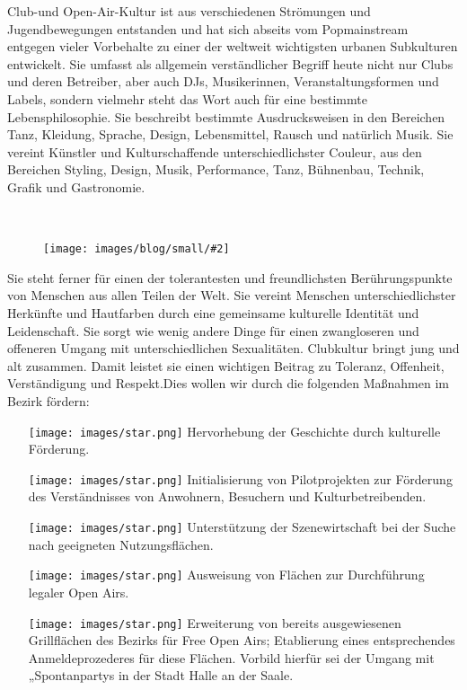 \documentclass[a4paper,10pt]{article}
\newcommand{\mysection}[1]{{\vspace{1cm}\noindent\color{gray}{\ttfamily\LARGE\raggedright #1}\\\medskip}}
\newcommand{\abschnitt}[2]{%
\mysection{\raggedright #1}%
\begin{figure}[t]%
\vspace*{-2.7cm}%
\hspace*{-2.1cm}%
\texttt{[image: images/blog/small/\#2]} %
\end{figure}%
}
\begin{document}
Club-und Open-Air-Kultur ist aus verschiedenen Strömungen und
Jugendbewegungen entstanden und hat sich abseits vom Popmainstream
entgegen vieler Vorbehalte zu einer der weltweit wichtigsten urbanen
Subkulturen entwickelt. Sie umfasst als allgemein verständlicher Begriff
heute nicht nur Clubs und deren Betreiber, aber auch DJs, Musikerinnen,
Veranstaltungsformen und Labels, sondern vielmehr steht das Wort auch
für eine bestimmte Lebensphilosophie. Sie beschreibt bestimmte
Ausdrucksweisen in den Bereichen Tanz, Kleidung, Sprache, Design,
Lebensmittel, Rausch und natürlich Musik. Sie vereint Künstler und
Kulturschaffende unterschiedlichster Couleur, aus den Bereichen Styling,
Design, Musik, Performance, Tanz, Bühnenbau, Technik, Grafik und
Gastronomie.

\clearpage
\abschnitt{}{Deephouse.png}

Sie steht ferner für einen der tolerantesten und freundlichsten
Berührungspunkte von Menschen aus allen Teilen der Welt. Sie vereint
Menschen unterschiedlichster Herkünfte und Hautfarben durch eine
gemeinsame kulturelle Identität und Leidenschaft. Sie sorgt wie wenig
andere Dinge für einen zwangloseren und offeneren Umgang mit
unterschiedlichen Sexualitäten. Clubkultur bringt jung und alt zusammen.
Damit leistet sie einen wichtigen Beitrag zu Toleranz, Offenheit,
Verständigung und Respekt.Dies wollen wir durch die folgenden Maßnahmen
im Bezirk fördern:

\begin{itemize}
\itemsep1pt\parskip0pt
\item[\texttt{[image: images/star.png]}]
  Hervorhebung der Geschichte durch kulturelle Förderung.
\item[\texttt{[image: images/star.png]}]
  Initialisierung von Pilotprojekten zur Förderung des Verständnisses
  von Anwohnern, Besuchern und Kulturbetreibenden.
\item[\texttt{[image: images/star.png]}]
  Unterstützung der Szenewirtschaft bei der Suche nach geeigneten
  Nutzungsflächen.
\item[\texttt{[image: images/star.png]}]
  Ausweisung von Flächen zur Durchführung legaler Open Airs.
\item[\texttt{[image: images/star.png]}]
  Erweiterung von bereits ausgewiesenen Grillflächen des Bezirks für
  Free Open Airs; Etablierung eines entsprechendes Anmeldeprozederes für
  diese Flächen. Vorbild hierfür sei der Umgang mit „Spontanpartys{\grqq} in
  der Stadt Halle an der Saale.
\end{itemize}
\end{document}
